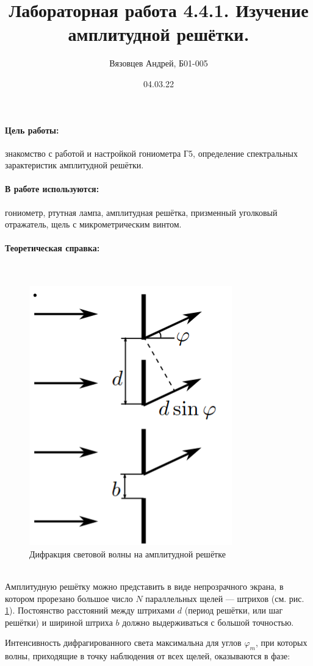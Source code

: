 \documentclass[a4paper, 12pt]{article}
\author{Вязовцев Андрей, Б01-005}
\date{04.03.22}
\title{Лабораторная работа 4.4.1. Изучение амплитудной решётки.}
\renewcommand{\phi}{\varphi}
\newcommand{\parag}[1]{\paragraph*{#1:}}
\begin{document}
\maketitle

\parag {Цель работы} знакомство с работой и настройкой гониометра Г5, определение спектральных зарактеристик амплитудной решётки.

\parag {В работе используются} гониометр, ртутная лампа, амплитудная решётка, призменный уголковый отражатель, щель с микрометрическим винтом.

\parag {Теоретическая справка} ~\\

\begin{figure}
    \includegraphics[scale = 0.45]{grid}
    \caption{Дифракция световой волны на амплитудной решётке\\~}
    \label{img:grid}
\end{figure}

Амплитудную решётку можно представить в виде непрозрачного экрана, в котором прорезано большое число $N$ параллельных щелей --- штрихов (см. рис. \ref{img:grid}). Постоянство расстояний между штрихами $d$ (период решётки, или шаг решётки) и шириной штриха $b$ должно выдерживаться с большой точностью.

Интенсивность дифрагированного света максимальна для углов $\phi_m$, при которых волны, приходящие в точку наблюдения от всех щелей, оказываются в фазе:
\end{document}

